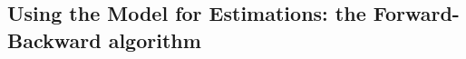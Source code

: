 \subsection[Forward-Backward algorithm]{Using the Model for
  Estimations: the Forward-Backward algorithm}
\label{sec:fb}

